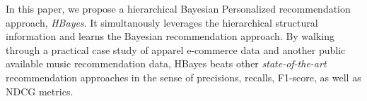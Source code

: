 In this paper, we propose a hierarchical Bayesian Personalized recommendation approach, \emph{HBayes}.  It simultanously leverages the hierarchical structural information and learns the Bayesian recommendation approach.   By walking through a practical case study of apparel e-commerce data and another public available music recommendation data, HBayes beats other \emph{state-of-the-art} recommendation approaches in the sense of precisions, recalls, F1-score, as well as NDCG metrics.   